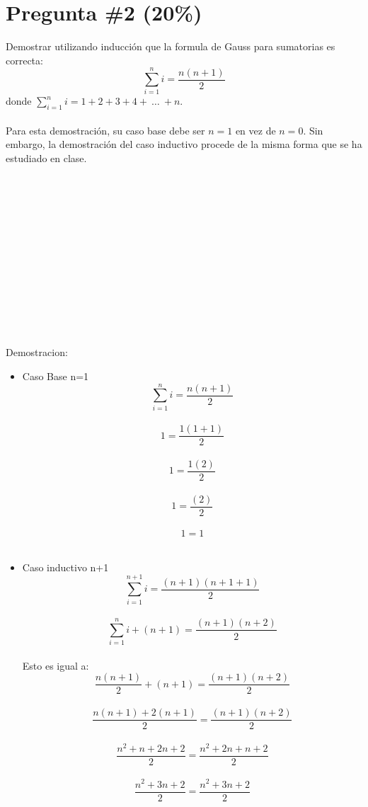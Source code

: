 \documentclass[10pt,a4paper]{article}
\begin{document}
\section*{Pregunta \#2 (20\%)}
Demostrar utilizando inducci\'on que la formula de Gauss para sumatorias es correcta:
\[
        \sum_{i=1}^{n}{i}=\frac{n(n+1)}{2}
\]
donde $\sum_{i=1}^{n}i=1+2+3+4+\ \ldots\ +n$.
\\\\
Para esta demostraci\'on, su caso base debe ser
$n=1$ en vez de $n=0$. Sin embargo, la demostraci\'on
del caso inductivo procede de la misma forma que
se ha estudiado en clase.
\\ \\ \\ \\ \\ \\ \\ \\ \\ \\ \\ \\ \\ \\
Demostracion:
\begin{itemize}
        \item{Caso Base}
        n=1 
            \[ \sum_{i=1}^{n}{i}=\frac{n(n+1)}{2} \] \\
            \[1 =\frac{1(1+1)}{2}  \]\\
            \[ 1 =\frac{1(2)}{2} \] \\
              \[ 1 =\frac{(2)}{2} \] \\
              \[ 1 = 1  \] \\
        \item{Caso inductivo n+1}
            \[ \sum_{i=1}^{n+1}{i}=\frac{(n+1)(n+1+1)}{2} \] \\
            \[ \sum_{i=1}^{n}{i}+(n+1)=\frac{(n+1)(n+2)}{2} \] \\
Esto es igual a:
            \[\frac{n(n+1)}{2} + (n+1)  =\frac{(n+1)(n+2)}{2} \] \\
            \[\frac{n(n+1)+2(n+1)} {2}   =\frac{(n+1)(n+2)}{2} \] \\
            \[\frac{n^2 +n +2n+2} {2}   =\frac{n^2 +2n +n+2}{2} \] \\
           \[\frac{n^2 +3n+2} {2}   =\frac{n^2 +3n+2}{2} \] \\
\end{itemize}
\end{document}
